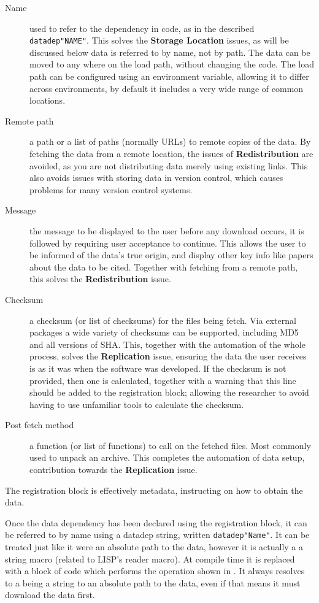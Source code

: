 \documentclass[twoside,11pt]{article}\usepackage{jmlr2e}
\newcommand{\datadep}[1]{\texttt{datadep"{}#1"{}}}
\begin{document}
\begin{description}
	\item[Name] used to refer to the dependency in code, as in the described \datadep{NAME}. 
	This solves the \textbf{Storage Location} issues, as will be discussed below data is referred to by name, not by path. The data can be moved to any where on the load path, without changing the code. The load path can be configured using an environment variable, allowing it to differ across environments, by default it includes a very wide range of common locations.
	\item[Remote path] a path or a list of paths (normally URLs) to remote copies of the data. By fetching the data from a remote location, the issues of \textbf{Redistribution} are avoided, as you are not distributing data merely using existing links. This also avoids issues with storing data in version control, which causes problems for many version control systems.
	\item[Message] the message to be displayed to the user before any download occurs, it is followed by requiring user acceptance to continue. This allows the user to be informed of the data's true origin, and display other key info like papers about the data to be cited. Together with fetching from a remote path, this solves the \textbf{Redistribution} issue.
	\item[Checksum] a checksum (or list of checksums) for the files being fetch. Via external packages a wide variety of checksums can be supported, including MD5 and all versions of SHA.
	This, together with the automation of the whole process, solves the \textbf{Replication} issue, 
	ensuring the data the user receives is as it was when the software was developed.
	If the checksum is not provided, then one is calculated, together with a warning that this line should be added to the registration block; allowing the researcher to avoid having to use unfamiliar tools to calculate the checksum.
	\item[Post fetch method] a function  (or list of functions) to call on the fetched files. Most commonly used to unpack an archive. This completes the automation of data setup, contribution towards the \textbf{Replication} issue.
\end{description}
\noindent The registration block is effectively metadata, instructing on how to obtain the data.

Once the data dependency has been declared using the registration block, it can be referred to by name using a datadep string, written \datadep{Name}.
It can be treated just like it were an absolute path to the data, however it is actually a a string macro (related to LISP's reader macro).
At compile time it is replaced with a block of code which performs the operation shown in .
It always resolves to a being a string to an absolute path to the data, even if that means it must download the data first.
\end{document}
